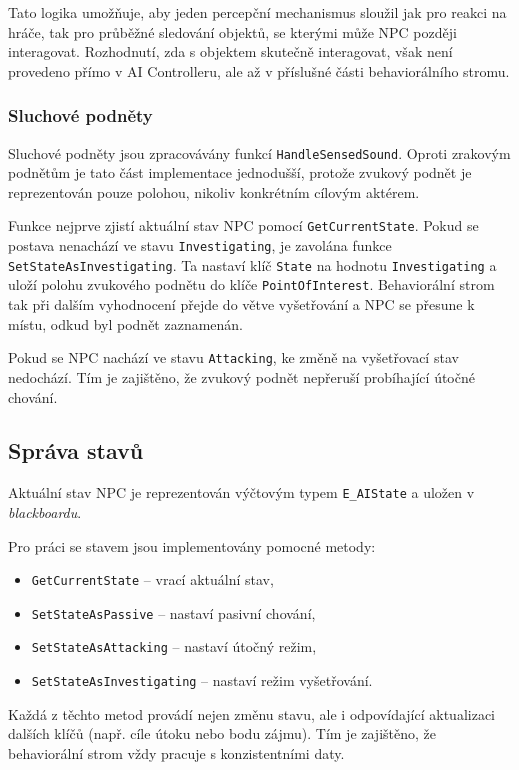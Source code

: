 Tato logika umožňuje, aby jeden percepční mechanismus sloužil jak pro reakci na hráče, tak pro průběžné sledování objektů, se kterými může NPC později interagovat. 
Rozhodnutí, zda s objektem skutečně interagovat, však není provedeno přímo v AI Controlleru, ale až v příslušné části behaviorálního stromu.


\subsubsection{Sluchové podněty}

Sluchové podněty jsou zpracovávány funkcí \texttt{HandleSensedSound}. 
Oproti zrakovým podnětům je tato část implementace jednodušší, protože zvukový podnět je reprezentován pouze polohou, nikoliv konkrétním cílovým aktérem.

Funkce nejprve zjistí aktuální stav NPC pomocí \texttt{GetCurrentState}. 
Pokud se postava nenachází ve stavu \texttt{Investigating}, je zavolána funkce \texttt{SetStateAsInvestigating}. 
Ta nastaví klíč \texttt{State} na hodnotu \texttt{Investigating} a uloží polohu zvukového podnětu do klíče \texttt{PointOfInterest}. 
Behaviorální strom tak při dalším vyhodnocení přejde do větve vyšetřování a NPC se přesune k místu, odkud byl podnět zaznamenán.

Pokud se NPC nachází ve stavu \texttt{Attacking}, ke změně na vyšetřovací stav nedochází. 
Tím je zajištěno, že zvukový podnět nepřeruší probíhající útočné chování.

\subsection{Správa stavů}

Aktuální stav NPC je reprezentován výčtovým typem \texttt{E\_AIState} a uložen v \textit{blackboardu}. 

Pro práci se stavem jsou implementovány pomocné metody:
\begin{itemize}
    \item \texttt{GetCurrentState} – vrací aktuální stav,
    \item \texttt{SetStateAsPassive} – nastaví pasivní chování,
    \item \texttt{SetStateAsAttacking} – nastaví útočný režim,
    \item \texttt{SetStateAsInvestigating} – nastaví režim vyšetřování.
\end{itemize}

Každá z těchto metod provádí nejen změnu stavu, ale i odpovídající aktualizaci dalších klíčů (např. cíle útoku nebo bodu zájmu).
Tím je zajištěno, že behaviorální strom vždy pracuje s konzistentními daty.

